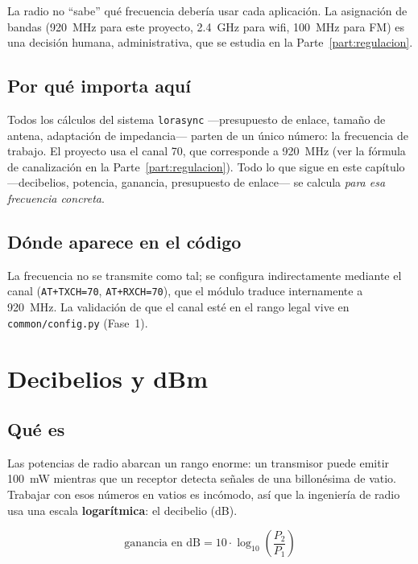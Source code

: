 \begin{nota}
La radio no ``sabe'' qué frecuencia debería usar cada aplicación. La asignación de bandas
(\SI{920}{MHz} para este proyecto, \SI{2.4}{GHz} para wifi, \SI{100}{MHz} para FM) es una
decisión humana, administrativa, que se estudia en la Parte~\ref{part:regulacion}.
\end{nota}

\section{Por qué importa aquí}

Todos los cálculos del sistema \texttt{lorasync} —presupuesto de enlace, tamaño de antena,
adaptación de impedancia— parten de un único número: la frecuencia de trabajo. El proyecto usa
el canal 70, que corresponde a \SI{920}{MHz} (ver la fórmula de canalización en la
Parte~\ref{part:regulacion}). Todo lo que sigue en este capítulo —decibelios, potencia,
ganancia, presupuesto de enlace— se calcula \emph{para esa frecuencia concreta}.

\section{Dónde aparece en el código}

La frecuencia no se transmite como tal; se configura indirectamente mediante el canal
(\texttt{AT+TXCH=70}, \texttt{AT+RXCH=70}), que el módulo traduce internamente a
\SI{920}{MHz}. La validación de que el canal esté en el rango legal vive en
\texttt{common/config.py} (Fase~1).

\chapter{Decibelios y dBm}

\section{Qué es}

Las potencias de radio abarcan un rango enorme: un transmisor puede emitir \SI{100}{mW}
mientras que un receptor detecta señales de una billonésima de vatio. Trabajar con esos
números en vatios es incómodo, así que la ingeniería de radio usa una escala
\textbf{logarítmica}: el decibelio (dB).

\begin{equation}
  \text{ganancia en dB} = 10 \cdot \log_{10}\!\left(\frac{P_2}{P_1}\right)
  \label{eq:db}
\end{equation}

